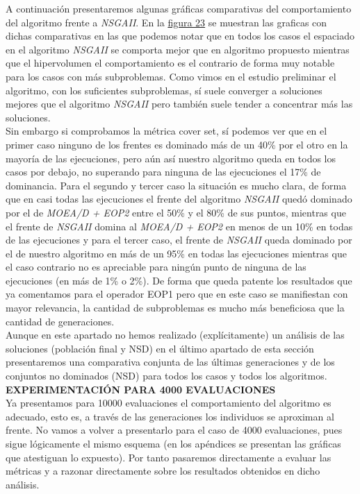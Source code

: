 A continuación presentaremos algunas gráficas comparativas del comportamiento del algoritmo frente a \textit{NSGAII}. En la \hyperref[fig:23]{figura 23} se muestran las graficas con dichas comparativas en las que podemos notar que en todos los casos el espaciado en el algoritmo \textit{NSGAII} se comporta mejor que en algoritmo propuesto mientras que el hipervolumen el comportamiento es el contrario de forma muy notable para los casos con más subproblemas. Como vimos en el estudio preliminar el algoritmo, con los suficientes subproblemas, sí suele converger a soluciones mejores que el algoritmo \textit{NSGAII} pero también suele tender a concentrar más las soluciones.\\

Sin embargo si comprobamos la métrica cover set, sí podemos ver que en el primer caso ninguno de los frentes es dominado más de un 40\% por el otro en la mayoría de las ejecuciones, pero aún así nuestro algoritmo queda en todos los casos por debajo, no superando para ninguna de las ejecuciones el 17\% de dominancia. Para el segundo y tercer caso la situación es mucho clara, de forma que en casi todas las ejecuciones el frente del algoritmo \textit{NSGAII} quedó dominado por el de \textit{MOEA/D + EOP2} entre el 50\% y el 80\% de sus puntos, mientras que el frente de  \textit{NSGAII} domina al \textit{MOEA/D + EOP2} en menos de un 10\% en todas de las ejecuciones y para el tercer caso, el frente de \textit{NSGAII} queda dominado por el de nuestro algoritmo en más de un 95\% en todas las ejecuciones mientras que el caso contrario no es apreciable para ningún punto de ninguna de las ejecuciones (en más de 1\% o 2\%). De forma que queda patente los resultados que ya comentamos para el operador EOP1 pero que en este caso se manifiestan con mayor relevancia, la cantidad de subproblemas es mucho más beneficiosa que la cantidad de generaciones.\\

Aunque en este apartado no hemos realizado (explícitamente) un análisis de las soluciones (población final y NSD) en el último apartado de esta sección presentaremos una comparativa conjunta de las últimas generaciones y de los conjuntos no dominados (NSD) para todos los casos y todos los algoritmos.	\\

\noindent\textbf{EXPERIMENTACIÓN PARA 4000 EVALUACIONES}\\

Ya presentamos para 10000 evaluaciones el comportamiento del algoritmo es adecuado, esto es, a través de las generaciones los individuos se aproximan al frente. No vamos a volver a presentarlo para el caso de 4000 evaluaciones, pues sigue lógicamente el mismo esquema (en los apéndices se presentan las gráficas que atestiguan lo expuesto). Por tanto pasaremos directamente a evaluar las métricas y a razonar directamente sobre los resultados obtenidos en dicho análisis.  \\

